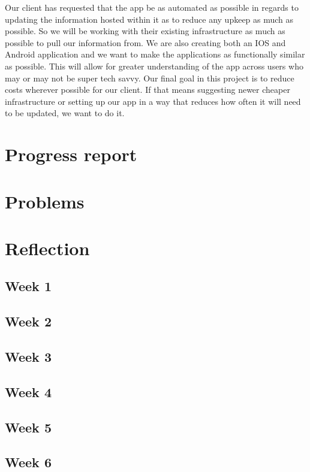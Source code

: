 \documentclass[letterpaper,10pt,draftclsnofoot,onecolumn,titlepage]{IEEEtran}
\begin{document}
	Our client has requested that the app be as automated as possible in regards to updating the information hosted within it as to reduce any upkeep as much as possible. 
	So we will be working with their existing infrastructure as much as possible to pull our information from. 
	We are also creating both an IOS and Android application and we want to make the applications as functionally similar as possible. 
	This will allow for greater understanding of the app across users who may or may not be super tech savvy. 
	Our final goal in this project is to reduce costs wherever possible for our client. 
	If that means suggesting newer cheaper infrastructure or setting up our app in a way that reduces how often it will need to be updated, we want to do it. 

		
		\section{Progress report}

		\section{Problems}

		\section{Reflection}
			\subsection{Week 1}
			
			\subsection{Week 2}
			
			\subsection{Week 3}
			
			\subsection{Week 4}
			
			\subsection{Week 5}
			
			\subsection{Week 6}
			
\end{document}
